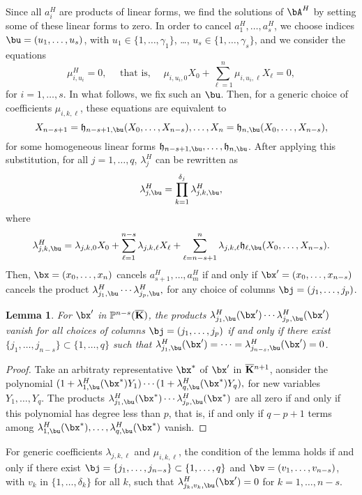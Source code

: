 \documentclass[12pt]{article}
\newtheorem{lemma}[definition]{Lemma}
\begin{document}
Since all $a_i^H$ are products of linear forms, we find the solutions
of $\bA^H$ by setting some of these linear forms to zero. In order to
cancel $a_1^H,\dots,a_s^H$, we choose indices $\bu=(u_1,\dots,u_s)$,
with $u_1\in\{1,\dots,\gamma_1\}$, \dots,
$u_s\in\{1,\dots,\gamma_s\}$, and we consider the equations 
$$\mu^H_{i,u_i}=0, \quad \text{~that is,~} \quad \mu_{i,u_i,0}X_0 + \sum_{\ell = 1}^{n}\mu_{i,u_i,\ell}X_\ell =0,$$ for $i=1,\dots,s$.
In what follows, we fix such an $\bu$.
Then, for a generic choice of coefficients $\mu_{i,k,\ell}$, these equations
are equivalent to
$$X_{n-s+1}=\mathfrak{h}_{n-s+1,\bu}(X_0,\dots,X_{n-s}),\dots,X_{n}=\mathfrak{h}_{n,\bu}(X_0,\dots,X_{n-s}),$$
for some homogeneous linear forms $\mathfrak{h}_{n-s+1,\bu},\dots,\mathfrak{h}_{n,\bu}$.
After applying this substitution, for all $j=1,\dots,q$, $\lambda^H_j$ can be rewritten as
$$\lambda^H_{j,\bu}=\prod_{k=1}^{\delta_j}\lambda^H_{j,k,\bu},$$
where 
$$\lambda^H_{j,k,\bu}=\lambda_{j,k,0}X_0 + \sum_{\ell =
  1}^{n-s}\lambda_{j,k,\ell}X_\ell + \sum_{\ell =
  n-s+1}^{n}\lambda_{j,k,\ell}
\mathfrak{h}_{\ell,\bu}(X_0,\dots,X_{n-s}).$$ Then,
$\bx=(x_0,\dots,x_n)$ cancels $a^H_{s+1},\dots,a^H_m$ if and only if
$\bx'=(x_0,\dots,x_{n-s})$ cancels the product
$\lambda^H_{j_1,\bu}\cdots \lambda^H_{j_p,\bu},$ for any choice of columns
$\bj=(j_1,\dots,j_p)$.

\begin{lemma}
  For $\bx'$ in $\mathbb{P}^{n-s}(\overline{\mathbf{K}})$, the products
  $\lambda^H_{j_1,\bu}(\bx')\cdots \lambda^H_{j_p,\bu}(\bx')$
  vanish for all choices of columns $\bj=(j_1,\dots,j_p)$ if and only
  if there exist $\{j_1,\dots,j_{n-s}\} \subset \{1,\dots,q\}$ such 
  that $\lambda^H_{j_1,\bu}(\bx')=\cdots=\lambda^H_{j_{n-s},\bu}(\bx')=0$.
\end{lemma}
\begin{proof}
  Take an arbitraty representative $\bx^*$ of $\bx'$ in
  $\overline{\mathbf{K}}{}^{n+1}$, aonsider the polynomial
  $(1+\lambda^H_{1,\bu}(\bx^*)Y_1) \cdots (1+\lambda^H_{q,\bu}(\bx^*)Y_q),$
  for new variables $Y_1,\dots,Y_q$. The products
  $\lambda^H_{j_1,\bu}(\bx^*)\cdots \lambda^H_{j_p,\bu}(\bx^*)$ are all zero
  if and only if this polynomial has degree less than $p$, that is, if
  and only if $q-p+1$ terms among
  $\lambda^H_{1,\bu}(\bx^*),\dots,\lambda^H_{q,\bu}(\bx^*)$ vanish.
\end{proof}


For generic coefficients $\lambda_{j,k,\ell}$ and $\mu_{i,k,\ell}$,
the condition of the lemma holds if and only if there exist
$\bj=\{j_1,\dots,j_{n-s}\} \subset \{1,\dots,q\}$ and
$\bv=(v_1,\dots,v_{n-s})$, with $v_k$ in $\{1,\dots,\delta_k\}$ for all
$k$, such that $\lambda^H_{j_k,v_k,\bu}(\bx')=0$ 
for $k=1,\dots,n-s$.
\end{document}
